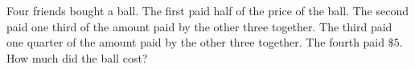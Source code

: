 Four friends bought a ball. The first paid half of the price of the ball. The second paid one third of the amount paid by the other three together. The third paid one quarter of the amount paid by the other three together. The fourth paid $\$5$. How much did the ball cost?
